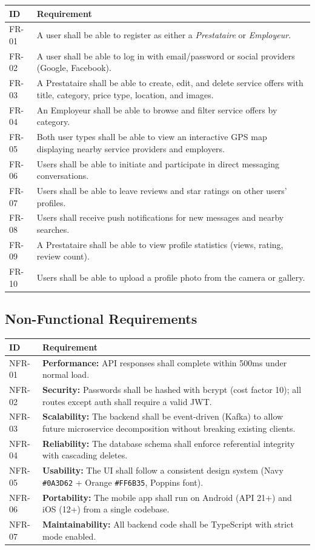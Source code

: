 \documentclass[12pt,a4paper]{report}
\begin{document}
\begin{longtable}{lp{10cm}}
\toprule
\textbf{ID} & \textbf{Requirement} \\
\midrule
FR-01 & A user shall be able to register as either a \textit{Prestataire} or \textit{Employeur}. \\
FR-02 & A user shall be able to log in with email/password or social providers (Google, Facebook). \\
FR-03 & A Prestataire shall be able to create, edit, and delete service offers with title, category, price type, location, and images. \\
FR-04 & An Employeur shall be able to browse and filter service offers by category. \\
FR-05 & Both user types shall be able to view an interactive GPS map displaying nearby service providers and employers. \\
FR-06 & Users shall be able to initiate and participate in direct messaging conversations. \\
FR-07 & Users shall be able to leave reviews and star ratings on other users' profiles. \\
FR-08 & Users shall receive push notifications for new messages and nearby searches. \\
FR-09 & A Prestataire shall be able to view profile statistics (views, rating, review count). \\
FR-10 & Users shall be able to upload a profile photo from the camera or gallery. \\
\bottomrule
\end{longtable}

\subsection{Non-Functional Requirements}

\begin{longtable}{lp{10cm}}
\toprule
\textbf{ID} & \textbf{Requirement} \\
\midrule
NFR-01 & \textbf{Performance:} API responses shall complete within 500ms under normal load. \\
NFR-02 & \textbf{Security:} Passwords shall be hashed with bcrypt (cost factor 10); all routes except auth shall require a valid JWT. \\
NFR-03 & \textbf{Scalability:} The backend shall be event-driven (Kafka) to allow future microservice decomposition without breaking existing clients. \\
NFR-04 & \textbf{Reliability:} The database schema shall enforce referential integrity with cascading deletes. \\
NFR-05 & \textbf{Usability:} The UI shall follow a consistent design system (Navy \texttt{\#0A3D62} + Orange \texttt{\#FF6B35}, Poppins font). \\
NFR-06 & \textbf{Portability:} The mobile app shall run on Android (API 21+) and iOS (12+) from a single codebase. \\
NFR-07 & \textbf{Maintainability:} All backend code shall be TypeScript with strict mode enabled. \\
\bottomrule
\end{longtable}
\end{document}
